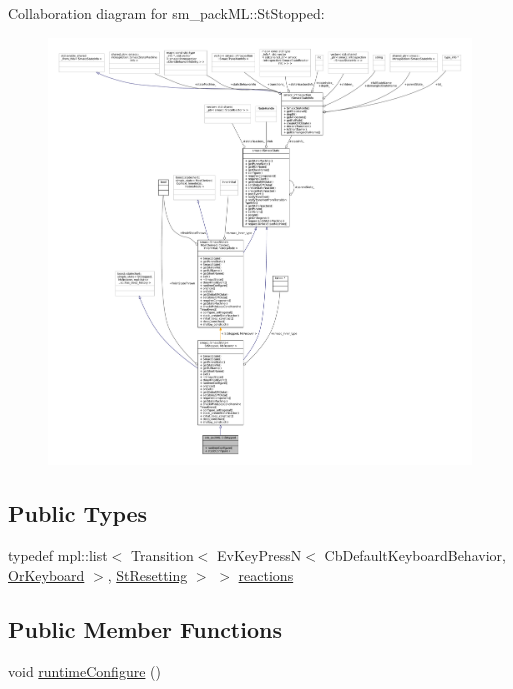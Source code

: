 Collaboration diagram for sm\+\_\+pack\+ML\+:\+:St\+Stopped\+:
\nopagebreak
\begin{figure}[H]
\begin{center}
\leavevmode
\includegraphics[width=350pt]{structsm__packML_1_1StStopped__coll__graph}
\end{center}
\end{figure}
\subsection*{Public Types}
\begin{DoxyCompactItemize}
\item 
typedef mpl\+::list$<$ Transition$<$ Ev\+Key\+PressN$<$ Cb\+Default\+Keyboard\+Behavior, \hyperlink{classsm__packML_1_1OrKeyboard}{Or\+Keyboard} $>$, \hyperlink{structsm__packML_1_1StResetting}{St\+Resetting} $>$ $>$ \hyperlink{structsm__packML_1_1StStopped_a349f46672e4136c4dc2e451b7ecad699}{reactions}
\end{DoxyCompactItemize}
\subsection*{Public Member Functions}
\begin{DoxyCompactItemize}
\item 
void \hyperlink{structsm__packML_1_1StStopped_a59f9f875b5f24cf0ef2f607b230582eb}{runtime\+Configure} ()
\end{DoxyCompactItemize}

